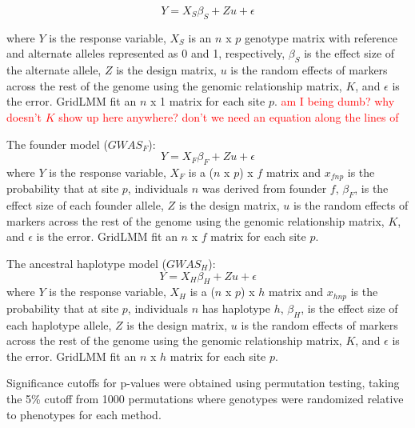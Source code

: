 \documentclass[article,9pt,twocolumn,twoside]{rilabRxiv}
\newcommand{\jri}[1]{{\small \textcolor{red}{#1}}}
\begin{document}
\begin{equation}
\label{eqn:gridlmm1}
 Y = X_S{\beta_S} + Zu + \epsilon
\end{equation}

where $Y$ is the response variable, $X_S$ is an $n$ x $p$ genotype matrix with reference and alternate alleles represented as 0 and 1, respectively, $\beta_S$ is the effect size of the alternate allele, $Z$ is the design matrix, $u$ is the random effects of markers across the rest of the genome using the genomic relationship matrix, $K$, and $\epsilon$ is the error.
GridLMM fit an $n$ x 1 matrix for each site $p$. \jri{am I being  dumb? why doesn't $K$ show up here anywhere? don't we need an equation along the lines of }

The founder model ($GWAS_F$):
\begin{equation}
\label{eqn:gridlmm2}
 Y = X_F{\beta_F} + Zu + \epsilon
\end{equation}
where $Y$ is the response variable, $X_F$ is a ($n$ x $p$) x $f$ matrix and $x_{fnp}$ is the probability that at site $p$, individuals $n$ was derived from founder $f$, $\beta_F$, is the effect size of each founder allele, $Z$ is the design matrix, $u$ is the random effects of markers across the rest of the genome using the genomic relationship matrix, $K$, and $\epsilon$ is the error. GridLMM fit an $n$ x $f$ matrix for each site $p$.

The ancestral haplotype model ($GWAS_H$):
\begin{equation}
\label{eqn:gridlmm3}
 Y = X_H{\beta_H} + Zu + \epsilon
\end{equation}
where $Y$ is the response variable, $X_H$ is a ($n$ x $p$) x $h$ matrix and $x_{hnp}$ is the probability that at site $p$, individuals $n$ has haplotype $h$, $\beta_H$, is the effect size of each haplotype allele, $Z$ is the design matrix, $u$ is the random effects of markers across the rest of the genome using the genomic relationship matrix, $K$, and $\epsilon$ is the error. GridLMM fit an $n$ x $h$ matrix for each site $p$.

 Significance cutoffs for p-values were obtained using permutation testing, taking the 5\% cutoff from 1000 permutations where genotypes were randomized relative to phenotypes for each method.
\end{document}
